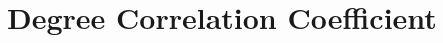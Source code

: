 \documentclass {article}
\begin{document}
\section{Degree Correlation Coefficient}
\subsection{}

\newpage
\end{document}
